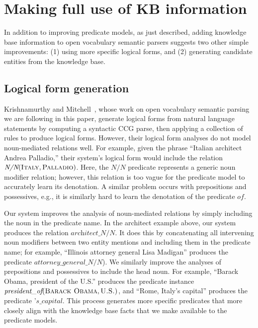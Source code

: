 \documentclass[11pt,letterpaper]{article}
\newcommand{\lexicalpredicate}[1]{\ensuremath{\textit{#1}}}
\newcommand{\entity}[1]{\ensuremath{\textsc{#1}}}
\begin{document}
\section{Making full use of KB information}

In addition to improving predicate models, as just described, adding knowledge
base information to open vocabulary semantic parsers suggests two other simple
improvements: (1) using more specific logical forms, and (2) generating
candidate entities from the knowledge base.

\subsection{Logical form generation}
\label{sec:better-lfs}

Krishnamurthy and
Mitchell~, whose work on
open vocabulary semantic parsing we are following in this paper, generate
logical forms from natural language statements by computing a syntactic CCG
parse, then applying a collection of rules to produce logical forms. However,
their logical form analyses do not model noun-mediated relations well. For
example, given the phrase ``Italian architect Andrea Palladio,'' their system's
logical form would include the relation $\lexicalpredicate{N/N}(\entity{Italy},
\entity{Palladio})$. Here, the \lexicalpredicate{N/N} predicate represents a
generic noun modifier relation; however, this relation is too vague for the
predicate model to accurately learn its denotation. A similar problem occurs
with prepositions and possessives, e.g., it is similarly hard to learn the
denotation of the predicate \lexicalpredicate{of}.

Our system improves the analysis of noun-mediated relations by simply including
the noun in the predicate name. In the architect example above, our system
produces the relation \lexicalpredicate{architect\_N/N}. It does this by
concatenating all intervening noun modifiers between two entity mentions and
including them in the predicate name; for example, ``Illinois attorney general
Lisa Madigan'' produces the predicate
\lexicalpredicate{attorney\_general\_N/N}).  We similarly improve the analyses
of prepositions and possessives to include the head noun. For example, ``Barack
Obama, president of the U.S.'' produces the predicate instance
$\lexicalpredicate{president\_of}(\entity{Barack Obama}, \entity{U.S.})$, and
``Rome, Italy's capital'' produces the predicate
\lexicalpredicate{'s\_capital}. This process generates more specific predicates
that more closely align with the knowledge base facts that we make available to
the predicate models.
\end{document}
